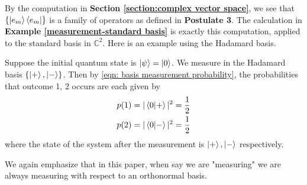 By the computation in \textbf{Section \ref{section:complex vector space}}, we see that $\{\ket{e_m}\bra{e_m}\}$ is a family of operators as defined in \textbf{Postulate 3}.  The calculation in \textbf{Example \ref{measurement-standard basis}} is exactly this computation, applied to the standard basis in  $\mathbb{C}^2$.  Here is an example using the Hadamard basis.


\begin{example}
Suppose the initial quantum state is $\ket{\psi}=\ket{0}$. We measure in the Hadamard basis $\{\ket{+}, \ket{-}\}$. Then by \eqref{eqn: basis measurement probability}, the probabilities that outcome 1, 2 occurs are each given by
\begin{gather}
    p(1)=|\braket{0|+}|^2=\frac{1}{2}\\
    p(2)=|\braket{0|-}|^2=\frac{1}{2}
\end{gather}
where the state of the system after the measurement is $\ket{+}, \ket{-}$ respectively.
\end{example}



We again emphasize that in this paper, when say we are "measuring" we are always measuring with respect to an orthonormal basis.


 \pagebreak
 
 
 
 
 
